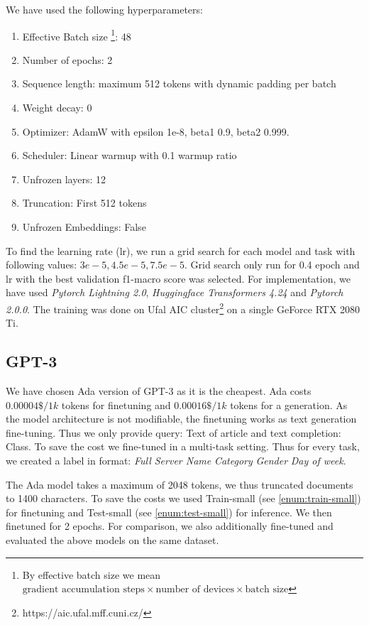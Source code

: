 We have used the following hyperparameters:
\begin{enumerate}
    \item Effective Batch size
    \footnote{By effective batch size we mean 
    $\text{gradient accumulation steps} \times \text{number of devices}
    \times \text{batch size}$
    }: 48
    \item Number of epochs: 2
    \item Sequence length: maximum 512 tokens with dynamic padding per batch
    \item Weight decay: 0
    \item Optimizer: AdamW with epsilon 1e-8, beta1 0.9, beta2 0.999.
    \item Scheduler: Linear warmup with 0.1 warmup ratio
    \item Unfrozen layers: 12
    \item Truncation: First 512 tokens
    \item Unfrozen Embeddings: False
\end{enumerate}
To find the learning rate (lr), we run a grid search for each model and task with following values: $3e-5, 4.5e-5, 7.5e-5$.
Grid search only run for 0.4 epoch and lr with the best validation f1-macro score was selected.
For implementation, we have used \textit{Pytorch Lightning 2.0}, \textit{Huggingface Transformers 4.24} and \textit{Pytorch 2.0.0}.
The training was done on Ufal AIC cluster\footnote{https://aic.ufal.mff.cuni.cz/} on a single GeForce RTX 2080 Ti.

\subsection{GPT-3}
\label{sec:gpt-3}
We have chosen Ada version of GPT-3 as it is the cheapest.
Ada costs $0.00004\$/1k$ tokens for finetuning and $0.00016\$/1k$ tokens for a generation.
As the model architecture is not modifiable, the finetuning works
as text generation fine-tuning.
Thus we only provide query: Text of article and text completion: Class.
To save the cost we fine-tuned in a multi-task setting.
Thus for every task, we created a label in format: \textit{Full Server Name} \textit{Category} \textit{Gender} \textit{Day of week}.

The Ada model takes a maximum of 2048 tokens, we thus truncated documents to 1400 characters.
To save the costs we used Train-small (see \autoref{enum:train-small}) for finetuning and
Test-small (see \autoref{enum:test-small}) for inference.
We then finetuned for 2 epochs.
For comparison, we also additionally fine-tuned and evaluated the above models on the same dataset.

